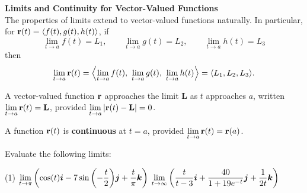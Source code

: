 \documentclass[../mathNotesPreamble]{subfiles}
\begin{document}
  \textbf{Limits and Continuity for Vector-Valued Functions}\\
    The properties of limits extend to vector-valued functions naturally. In particular, for ${\mathbf{r}}(t)={\left\langle f(t), g(t), h(t) \right\rangle}$, if
      \[\lim_{t\to a} f(t)=L_1, \qquad \lim_{t\to a} g(t)=L_2, \qquad \lim_{t\to a} h(t)=L_3\]
    then
      \[\lim_{t\to a} {\mathbf{r}}(t)={\left\langle \lim_{t\to a} f(t),\ \lim_{t\to a} g(t),\ \lim_{t\to a} h(t) \right\rangle}={\left\langle L_1,L_2,L_3 \right\rangle}.\]
  \begin{defn*}
    A vector-valued function ${\mathbf{r}}$ approaches the limit $\mathbf L$ as $t$ approaches $a$, written \newline$\displaystyle\lim_{t\to a} {\mathbf{r}}(t)=\mathbf L$, provided $\displaystyle\lim_{t\to a}{\left\vert{\mathbf{r}}(t)-\mathbf L\right\vert}=0$.
    \vspace*{\baselineskip}
    
    A function ${\mathbf{r}}(t)$ is \textbf{continuous} at $t=a$, provided $\displaystyle \lim_{t\to a} {\mathbf{r}}(t)={\mathbf{r}}(a)$.
  \end{defn*}

  \begin{ex*}
    Evaluate the following limits:
    \begin{tasks}[after-item-skip=\stretch{1}, label=](1)
      \task 
        $\displaystyle \lim_{t\to \pi} {\left(\cos(t){\bm{i}}-7\sin{\left(-\frac{t}{2}\right)}{\bm{j}}+\frac{t}{\pi}{\bm{k}}\right)}$
      \task 
        $\displaystyle \lim_{t\to \infty} {\left(\frac{t}{t-3}{\bm{i}}+\frac{40}{1+19e^{-t}}{\bm{j}}+\frac{1}{2t}{\bm{k}}\right)}$
    \end{tasks}
  \end{ex*}

  \pagebreak
  
\end{document}
